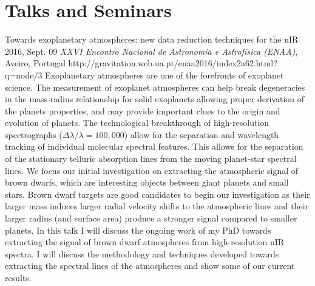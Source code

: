 \section{Talks and Seminars}	\label{sec:talks}

{Towards exoplanetary atmospheres: new data reduction techniques for the nIR} %
{2016, Sept. 09}%
{\textit{XXVI Encontro Nacional de Astronomia e Astrofísica (ENAA)}, Aveiro, Portugal}%
{http://gravitation.web.ua.pt/enaa2016/index2a62.html?q=node/3}%
{}%
{
    Exoplanetary atmospheres are one of the forefronts of exoplanet science. The measurement of exoplanet atmospheres can help break degeneracies in the mass-radius relationship for solid exoplanets allowing proper derivation of the planets properties, and may provide important clues to the origin and evolution of planets. 
    The technological breakthrough of high-resolution spectrographs ($\Delta \lambda / \lambda = 100,000$) 
    allow for the separation and wavelength tracking of individual molecular spectral features. This allows for the separation of the stationary telluric absorption lines from the moving planet-star spectral lines. 
    We focus our initial investigation on extracting the atmospheric signal of brown dwarfs, which are interesting objects between giant planets and small stars. Brown dwarf targets are good candidates to begin our investigation as their larger mass induces larger radial velocity shifts to the atmospheric lines and their larger radius (and surface area) produce a stronger signal compared to smaller planets.
    In this talk I will discuss the ongoing work of my PhD towards extracting the signal of brown dwarf atmospheres from high-resolution nIR spectra. I will discuss the methodology and techniques developed towards extracting the spectral lines of the atmospheres and show some of our current results.
}%
